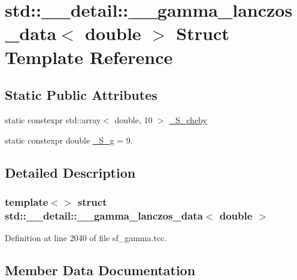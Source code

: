\hypertarget{structstd_1_1____detail_1_1____gamma__lanczos__data_3_01double_01_4}{}\section{std\+:\+:\+\_\+\+\_\+detail\+:\+:\+\_\+\+\_\+gamma\+\_\+lanczos\+\_\+data$<$ double $>$ Struct Template Reference}
\label{structstd_1_1____detail_1_1____gamma__lanczos__data_3_01double_01_4}
\subsection*{Static Public Attributes}
\begin{DoxyCompactItemize}
\item 
static constexpr std\+::array$<$ double, 10 $>$ \hyperlink{structstd_1_1____detail_1_1____gamma__lanczos__data_3_01double_01_4_a315868c6a789a5e7455f7eb4d8d86115}{\+\_\+\+S\+\_\+cheby}
\item 
static constexpr double \hyperlink{structstd_1_1____detail_1_1____gamma__lanczos__data_3_01double_01_4_ab7959ed84fcc00db67df8b167165513d}{\+\_\+\+S\+\_\+g} = 9.
\end{DoxyCompactItemize}


\subsection{Detailed Description}
\subsubsection*{template$<$$>$\newline
struct std\+::\+\_\+\+\_\+detail\+::\+\_\+\+\_\+gamma\+\_\+lanczos\+\_\+data$<$ double $>$}



Definition at line 2040 of file sf\+\_\+gamma.\+tcc.



\subsection{Member Data Documentation}
\mbox{\label{structstd_1_1____detail_1_1____gamma__lanczos__data_3_01double_01_4_a315868c6a789a5e7455f7eb4d8d86115}} 
